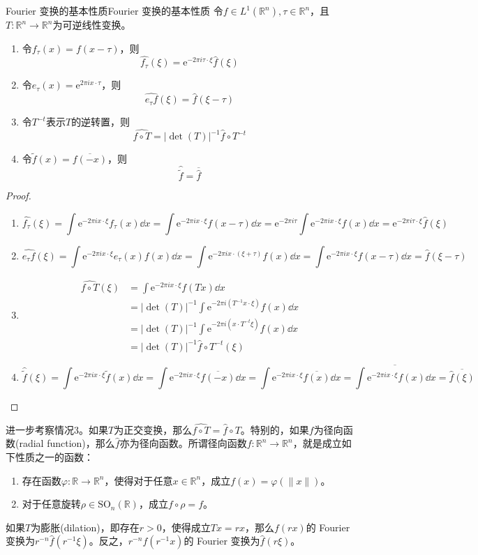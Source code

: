 \documentclass[lang = cn, %
scheme = chinese          %
]
{elegantbook}             %
\newcommand{\R}{\mathbb{R}}            %
\newcommand{\ee}[1]{\mathrm{e}^{#1}}           %
\begin{document}
\begin{proposition}{Fourier 变换的基本性质}{Fourier 变换的基本性质}
	令$f\in L^1(\R^n),\tau\in\R^n$，且$T:\R^n\to\R^n$为可逆线性变换。
	\begin{enumerate}
		\item 令$f_{\tau}(x)=f(x-\tau)$，则
		\[
		\widehat{f_\tau}(\xi)
		=\ee{-2\pi i \tau \cdot \xi}\widehat{f}(\xi)
		\]
		\item 令$e_\tau(x)=\ee{2\pi i x\cdot \tau}$，则
		\[
		\widehat{e_\tau f}(\xi)=\widehat{f}(\xi-\tau)
		\]
		\item 令$T^{-t}$表示$T$的逆转置，则
		\[
		\widehat{f\circ T}=|\det(T)|^{-1}\widehat{f}\circ T^{-t}
		\]
		\item 令$\tilde{f}(x)=\overline{f(-x)}$，则
		\[
		\widehat{\tilde{f}}=\overline{\widehat{f}}
		\]
	\end{enumerate}
\end{proposition}

\begin{proof}
	\begin{enumerate}
		\item 
		\[
		\widehat{f_\tau}(\xi)
		=\int\ee{-2\pi i x \cdot \xi}f_\tau(x)\dd x
		=\int\ee{-2\pi i x \cdot \xi}f(x-\tau)\dd x
		=\ee{-2\pi i \tau}\int\ee{-2\pi i x \cdot \xi}f(x)\dd x
		=\ee{-2\pi i \tau \cdot \xi}\widehat{f}(\xi)
		\]
		\item 
		\[
		\widehat{e_\tau f}(\xi)
		=\int\ee{-2\pi i x \cdot \xi}e_\tau(x)f(x)\dd x
		=\int\ee{-2\pi i x \cdot (\xi+\tau)}f(x)\dd x
		=\int\ee{-2\pi i x \cdot \xi}f(x-\tau)\dd x
		=\widehat{f}(\xi-\tau)
		\]
		\item 
		\begin{align*}
			\widehat{f\circ T}(\xi)
			& = \int\ee{-2\pi i x \cdot \xi}f(Tx)\dd x \\
			& = |\det(T)|^{-1}\int\ee{-2\pi i (T^{-1}x \cdot \xi)}f(x)\dd x \\
			& = |\det(T)|^{-1}\int\ee{-2\pi i (x \cdot T^{-t}\xi)}f(x)\dd x \\
			& = |\det(T)|^{-1}\widehat{f}\circ T^{-t}(\xi)
		\end{align*}
		\item 
		\[
		\widehat{\tilde{f}}(\xi)
		= \int\ee{-2\pi i x \cdot \xi}\tilde{f}(x)\dd x
		= \int\ee{-2\pi i x \cdot \xi}\overline{f(-x)}\dd x 
		= \int\ee{-2\pi i x \cdot \xi}\overline{f(x)}\dd x 
		= \overline{\int\ee{-2\pi i x \cdot \xi}f(x)\dd x}
		= \overline{\widehat{f}(\xi)}
		\]
	\end{enumerate}
\end{proof}

进一步考察情况3。如果$T$为正交变换，那么$\widehat{f\circ T}=\widehat{f}\circ T$。特别的，如果$f$为径向函数(radial function)，那么$\widehat{f}$亦为径向函数。所谓径向函数$f:\R^n\to\R^n$，就是成立如下性质之一的函数：
\begin{enumerate}
	\item 存在函数$\varphi:\R\to\R^n$，使得对于任意$x\in\R^n$，成立$f(x)=\varphi(\|x\|)$。
	\item 对于任意旋转$\rho\in\text{SO}_n(\R)$，成立$f\circ\rho=f$。
\end{enumerate}
如果$T$为膨胀(dilation)，即存在$r>0$，使得成立$Tx=rx$，那么$f(rx)$的 Fourier 变换为$r^{-n}\widehat{f}(r^{-1}\xi)$。反之，$r^{-n}f(r^{-1}x)$的 Fourier 变换为$\widehat{f}(r\xi)$。
\end{document}
